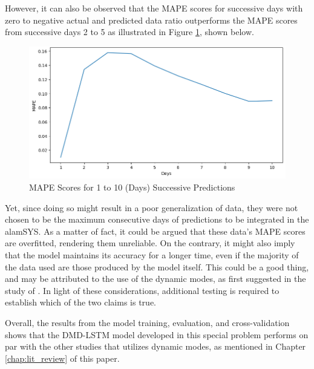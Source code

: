 However, it can also be observed that the MAPE scores for
successive days with zero to negative actual and predicted data
ratio outperforms the MAPE scores from successive days 2 to 5
as illustrated in Figure \ref{fig:MAPE_successive}, shown below.
\hfill \\

\begin{figure}[ht]
    \centering
    \includegraphics[width=1\textwidth]{./assets/Chapter_4/MAPE_successive.png}
    \caption{MAPE Scores for 1 to 10 (Days) Successive Predictions}
    \label{fig:MAPE_successive}
\end{figure}
\FloatBarrier

Yet, since doing so might result in a poor generalization of data, 
they were not chosen to be the maximum consecutive days of predictions 
to be integrated in the alamSYS. As a matter of fact, it could be 
argued that these data's MAPE scores are overfitted, rendering them 
unreliable. On the contrary, it might also imply that the model 
maintains its accuracy for a longer time, even if the majority of 
the data used are those produced by the model itself. This could be 
a good thing, and may be attributed to the use of the dynamic modes,
as first suggested in the study of .
In light of these considerations, additional testing is required to 
establish which of the two claims is true.

Overall, the results from the model training, evaluation, and cross-validation
shows that the DMD-LSTM model developed in this special problem performs
on par with the other studies that utilizes dynamic modes, as mentioned in 
Chapter \ref{chap:lit_review} of this paper.